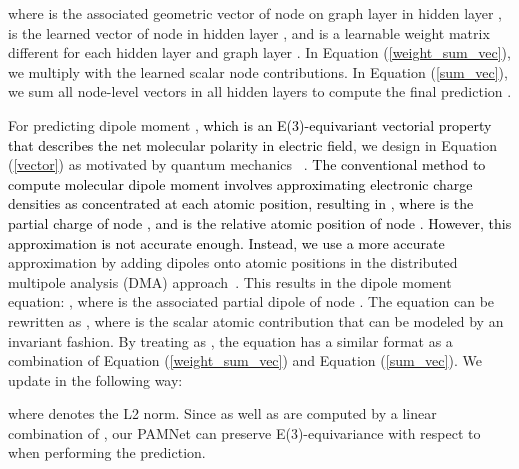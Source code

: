 \documentclass[fleqn,10pt]{wlscirep}
\newcommand{\method}{PAMNet\xspace}
\begin{document}
where  is the associated geometric vector of node  on graph layer  in hidden layer ,  is the learned vector of node  in hidden layer , and  is a learnable weight matrix different for each hidden layer  and graph layer . In Equation (\ref{weight_sum_vec}), we multiply  with the learned scalar node contributions. In Equation (\ref{sum_vec}), we sum all node-level vectors in all hidden layers to compute the final prediction .

For predicting dipole moment  , \textcolor{black}{which is an E(3)-equivariant vectorial property that describes the net molecular polarity in electric field}, we design  in Equation (\ref{vector}) as motivated by quantum mechanics ~\cite{veit2020predicting}. \textcolor{black}{The conventional method to compute molecular dipole moment involves approximating electronic charge densities as concentrated at each atomic position, resulting in , where  is the partial charge of node , and  is the relative atomic position of node . However, this approximation is not accurate enough. Instead, we use a more accurate} approximation by adding dipoles onto atomic positions in the distributed multipole analysis (DMA) approach~\cite{stone1981distributed}. This results in the dipole moment equation: , where  is the associated partial dipole of node . The equation can be rewritten as , where  is the scalar atomic contribution that can be modeled by an invariant fashion. By treating  as , the equation has a similar format as a combination of Equation (\ref{weight_sum_vec}) and Equation (\ref{sum_vec}). We update  in the following way:  

where  denotes the L2 norm. Since  as well as  are computed by a linear combination of , our \method can preserve E(3)-equivariance with respect to  when performing the prediction.
\end{document}
